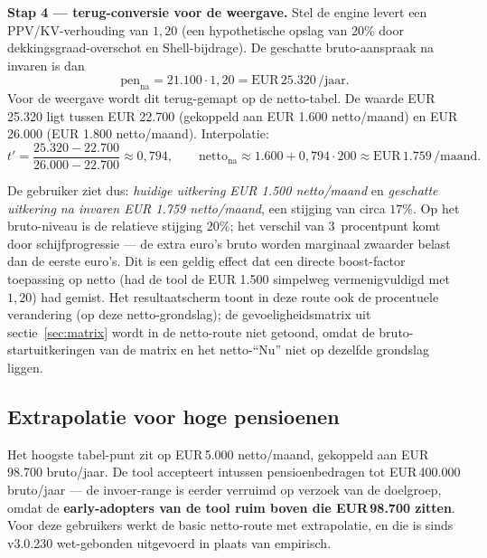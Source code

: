 \documentclass[11pt,a4paper]{article}
\begin{document}
\textbf{Stap 4 --- terug-conversie voor de weergave.} Stel de engine levert een PPV/KV-verhouding van $1{,}20$ (een hypothetische opslag van 20\% door dekkingsgraad-overschot en Shell-bijdrage). De geschatte bruto-aanspraak na invaren is dan
\[
\text{pen}_{\text{na}} = 21.100 \cdot 1{,}20 = \text{EUR}\,25.320\,/\text{jaar}.
\]
Voor de weergave wordt dit terug-gemapt op de netto-tabel. De waarde EUR 25.320 ligt tussen EUR 22.700 (gekoppeld aan EUR 1.600 netto/maand) en EUR 26.000 (EUR 1.800 netto/maand). Interpolatie:
\[
t' = \frac{25.320 - 22.700}{26.000 - 22.700} \approx 0{,}794, \qquad
\text{netto}_{\text{na}} \approx 1.600 + 0{,}794 \cdot 200 \approx \text{EUR}\,1.759\,/\text{maand}.
\]

De gebruiker ziet dus: \emph{huidige uitkering EUR 1.500 netto/maand} en \emph{geschatte uitkering na invaren EUR 1.759 netto/maand}, een stijging van circa $17\%$. Op het bruto-niveau is de relatieve stijging $20\%$; het verschil van 3~procentpunt komt door schijfprogressie --- de extra euro's bruto worden marginaal zwaarder belast dan de eerste euro's. Dit is een geldig effect dat een directe boost-factor toepassing op netto (had de tool de EUR 1.500 simpelweg vermenigvuldigd met~$1{,}20$) had gemist. Het resultaatscherm toont in deze route ook de procentuele verandering (op deze netto-grondslag); de gevoeligheidsmatrix uit sectie~\ref{sec:matrix} wordt in de netto-route niet getoond, omdat de bruto-startuitkeringen van de matrix en het netto-``Nu'' niet op dezelfde grondslag liggen.

\subsection{Extrapolatie voor hoge pensioenen}
\label{sec:netto-extrapolatie}

Het hoogste tabel-punt zit op EUR\,5.000 netto/maand, gekoppeld aan EUR\,98.700 bruto/jaar. De tool accepteert intussen pensioenbedragen tot EUR\,400.000 bruto/jaar --- de invoer-range is eerder verruimd op verzoek van de doelgroep, omdat de \textbf{early-adopters van de tool ruim boven die EUR\,98.700 zitten}. Voor deze gebruikers werkt de basic netto-route met extrapolatie, en die is sinds v3.0.230 wet-gebonden uitgevoerd in plaats van empirisch.
\end{document}
